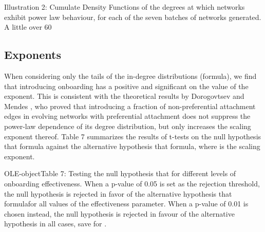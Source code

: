 Illustration 2: Cumulate Density Functions of the degrees at which networks exhibit power law behaviour, for each of the seven batches of networks generated. A little over 60%

\subsection{Exponents}
When considering only the tails of the in-degree distributions (formula), we find that introducing onboarding has a positive and significant on the value of the exponent. This is consistent with the theoretical results by Dorogovtsev and Mendes \cite{dorogovtsev2002evolution}, who proved that introducing a fraction of non-preferential attachment edges in evolving networks with preferential attachment does not suppress the power-law dependence of its degree distribution, but only increases the scaling exponent thereof. Table 7 summarizes the results of t-tests on the null hypothesis that formula against the alternative hypothesis that formula, where is the scaling exponent. 

OLE-objectTable 7: Testing the null hypothesis that   for different levels of onboarding effectiveness. When a p-value of 0.05 is set as the rejection threshold, the null hypothesis is rejected in favor of the alternative hypothesis that formulafor all values of the effectiveness parameter. When a p-value of 0.01 is chosen instead, the null hypothesis is rejected in favour of the alternative hypothesis in all cases, save for .